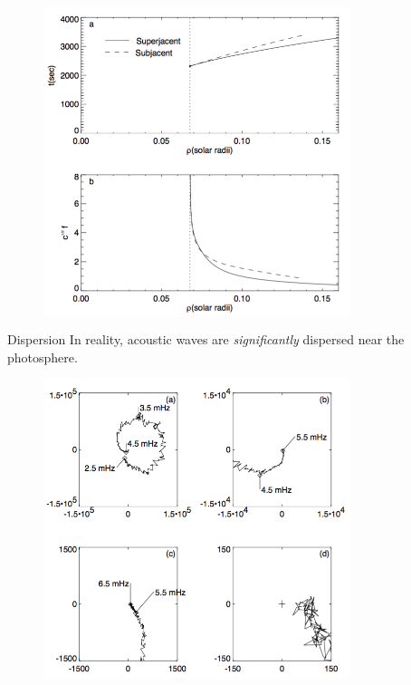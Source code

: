 \documentclass{beamer}
\begin{document}
\begin{frame}
    \begin{figure}
        \includegraphics[width=0.8\textwidth]{fig_9.png}
    \end{figure}
\end{frame}

\begin{frame}{Dispersion}
    In reality, acoustic waves are \emph{significantly} dispersed
    near the photosphere.
\end{frame}

\begin{frame}{8.9}
\end{frame}

\begin{frame}{8.11}
\end{frame}

\begin{frame}
    \begin{figure}
        \includegraphics[width=0.8\textwidth]{fig_10.png}
    \end{figure}
\end{frame}
\end{document}
